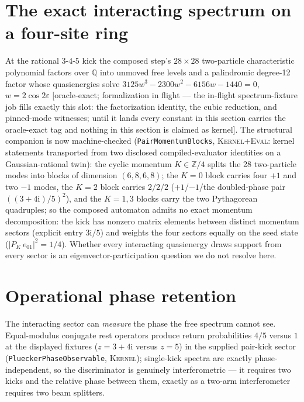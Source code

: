\documentclass[11pt]{article}
\newcommand{\ii}{\mathrm{i}}
\newcommand{\Kernel}{\textcolor{kernelcolor}{\textsc{Kernel}}}
\newcommand{\DraftTrust}{\textcolor{draftcolor}{\textsc{Kernel+Eval}}}
\begin{document}
\section{The exact interacting spectrum on a four-site ring}
At the rational $3$-$4$-$5$ kick the
composed step's $28\times28$ two-particle characteristic polynomial
factors over $\mathbb{Q}$ into unmoved free levels and a palindromic
degree-12 factor whose quasienergies solve
$3125w^3-2300w^2-6156w-1440=0$, $w=2\cos2\varepsilon$ [oracle-exact;
formalization in flight --- the in-flight spectrum-fixture job fills
exactly this slot: the factorization identity, the cubic reduction, and
pinned-mode witnesses; until it lands every constant in this section
carries the oracle-exact tag and nothing in this section is claimed as
kernel].  The structural companion is now machine-checked
(\texttt{PairMomentumBlocks}, \DraftTrust{}: kernel statements
transported from two disclosed compiled-evaluator identities on a
Gaussian-rational twin): the cyclic momentum $K\in\mathbb{Z}/4$ splits
the 28
two-particle modes into blocks of dimension $(6,8,6,8)$; the $K=0$ block
carries four $+1$ and two $-1$ modes, the $K=2$ block carries $2/2/2$
($+1$/$-1$/the doubled-phase pair $((3+4\ii)/5)^2$), and the $K=1,3$
blocks carry the two Pythagorean quadruples; so the composed automaton
admits no exact momentum decomposition: the kick has nonzero matrix
elements between distinct momentum sectors (explicit entry $3\ii/5$) and
weights the four sectors equally on the seed state
($|P_K\,e_{01}|^2=1/4$).  Whether every interacting quasienergy draws
support from every sector is an eigenvector-participation question we do
not resolve here.

\section{Operational phase retention}

The interacting sector can \emph{measure} the phase the free spectrum
cannot see.  Equal-modulus conjugate rest operators
produce return probabilities $4/5$ versus $1$ at the displayed fixtures
($z=3+4\ii$ versus $z=5$) in the supplied pair-kick
sector (\texttt{PlueckerPhaseObservable}, \Kernel{}); single-kick
spectra are exactly phase-independent, so the discriminator is genuinely
interferometric --- it requires two kicks and the relative phase between
them, exactly as a two-arm interferometer requires two beam splitters.
\end{document}
